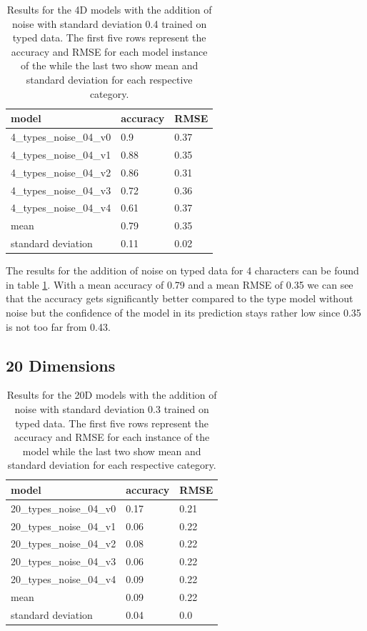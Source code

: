 \begin{table}[!htb]
	\centering
	\caption{Results for the 4D models with the addition of noise with standard deviation 0.4 trained on typed data. The first five rows represent the accuracy and RMSE for each model instance of the while the last two show mean and standard deviation for each respective category.}
	\begin{tabularx}{\textwidth}{ X  X  X }
		\hline
		model & accuracy & RMSE \\ 
		\hline
		4\_types\_noise\_04\_v0 & 0.9  &0.37 \\ 
		4\_types\_noise\_04\_v1 & 0.88 &0.35 \\
		4\_types\_noise\_04\_v2 & 0.86 &0.31 \\ 
		4\_types\_noise\_04\_v3 & 0.72 &0.36 \\ 
		4\_types\_noise\_04\_v4 & 0.61 &0.37 \\ \hline
		mean & 0.79 &  0.35\\
		standard deviation & 0.11 & 0.02\\
		\hline
	\end{tabularx}
	\label{table:4_types_noise_04}
\end{table}

The results for the addition of noise on typed data for 4 characters can be found in table \ref{table:4_types_noise_04}. With a mean accuracy of 0.79 and a mean RMSE of 0.35 we can see that the accuracy gets significantly better compared to the type model without noise but the confidence of the model in its prediction stays rather low since 0.35 is not too far from 0.43. 

\subsection{20 Dimensions}

\begin{table}[!htb]
	\centering
	\caption{Results for the 20D models with the addition of noise with standard deviation 0.3 trained on typed data. The first five rows represent the accuracy and RMSE for each instance of the model while the last two show mean and standard deviation for each respective category.}
	\begin{tabularx}{\textwidth}{ X  X  X }
		\hline
		model & accuracy & RMSE \\ 
		\hline
		20\_types\_noise\_04\_v0 & 0.17 &0.21 \\ 
		20\_types\_noise\_04\_v1 & 0.06 &0.22 \\
		20\_types\_noise\_04\_v2 & 0.08 &0.22 \\ 
		20\_types\_noise\_04\_v3 & 0.06 &0.22 \\ 
		20\_types\_noise\_04\_v4 & 0.09 &0.22 \\ \hline
		mean & 0.09 &  0.22\\
		standard deviation & 0.04 & 0.0\\
		\hline
	\end{tabularx}
	\label{table:20_types_noise_03}
\end{table}

